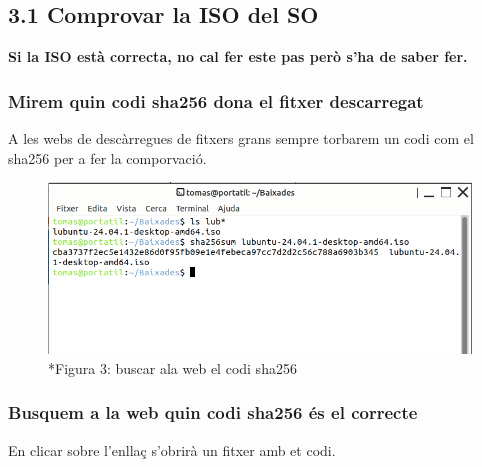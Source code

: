 \documentclass[
  a4paper,
]{article}
\begin{document}
\subsection{3.1 Comprovar la ISO del SO}\label{comprovar-la-iso-del-so}

\textbf{Si la ISO està correcta, no cal fer este pas però s'ha de saber
fer.}

\subsubsection{Mirem quin codi sha256 dona el fitxer
descarregat}\label{mirem-quin-codi-sha256-dona-el-fitxer-descarregat}

A les webs de descàrregues de fitxers grans sempre torbarem un codi com
el sha256 per a fer la comporvació.

\begin{figure}
\centering
\includegraphics{png/sha256sum1.png}
\caption{*Figura 3: buscar ala web el codi sha256}
\end{figure}

\subsubsection{Busquem a la web quin codi sha256 és el
correcte}\label{busquem-a-la-web-quin-codi-sha256-uxe9s-el-correcte}

En clicar sobre l'enllaç s'obrirà un fitxer amb et codi.
\end{document}
